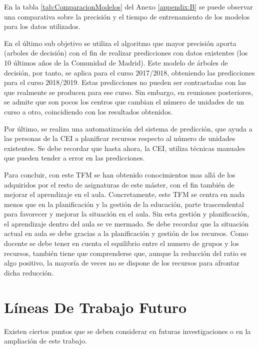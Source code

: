 En la tabla \ref{tab:ComparacionModelos} del Anexo \ref{appendix:B}  se puede observar una comparativa sobre la precisión y el tiempo de entrenamiento de los modelos para los datos utilizados. 

En el último sub objetivo se utiliza el algoritmo que mayor precisión aporta (arboles de decisión) con el fin de realizar predicciones con datos existentes (los 10 últimos años de la Comunidad de Madrid). Este modelo de árboles de decisión, por tanto, se aplica para el curso 2017/2018, obteniendo las predicciones para el curso 2018/2019. Estas predicciones no pueden ser contrastadas con las que realmente se producen para ese curso. Sin embargo, en reuniones posteriores, se admite que son pocos los centros que cambian el número de unidades de un curso a otro, coincidiendo con los resultados obtenidos.

Por último, se realiza una automatización del sistema de predicción, que ayuda a las personas de la CEI a planificar recursos respecto al número de unidades existentes. Se debe recordar que hasta ahora, la CEI, utiliza técnicas manuales que pueden tender a error en las predicciones. %


Para concluir, con este TFM se han obtenido conocimientos mas allá de los adquiridos por el resto de asignaturas de este máster, con el fin también de mejorar el aprendizaje en el aula. Concretamente, este TFM se centra en nada menos que en la planificación y la gestión de la educación, parte trascendental para favorecer y mejorar la situación en el aula. Sin esta gestión y planificación, el aprendizaje dentro del aula se ve mermado. Se debe recordar que la situación actual en aula se debe gracias a la planificación y gestión de los recursos. Como docente se debe tener en cuenta el equilibrio entre el numero de grupos y los recursos, también tiene que comprenderse que, aunque la reducción del ratio es algo positivo, la mayoría de veces no se dispone de los recursos para afrontar dicha reducción.



\section{Líneas De Trabajo Futuro}
Existen ciertos puntos que se deben considerar en futuras investigaciones o en la ampliación de este trabajo.

